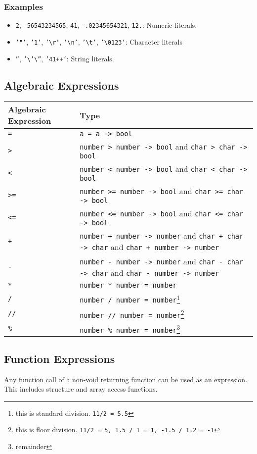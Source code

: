 \documentclass{article}
\newcommand{\code}[1]{\texttt{#1}}
\begin{document}
\subsubsection{Examples}
\begin{itemize}
\item \code{2}, \code{-56543234565}, \code{41}, \code{-.02345654321}, \code{12.}: Numeric literals.
\item \code{'"'}, \code{'1'}, \code{'\textbackslash{}r'}, \code{'\textbackslash{}n'}, \code{'\textbackslash{}t'}, \code{'\textbackslash{}0123'}: Character literals
\item \code{''}, \code{'\textbackslash'\textbackslash''}, \code{'41++'}: String literals.
\end{itemize}
\subsection{Algebraic Expressions}
\begin{tabular}{|l|p{10cm}|}
\hline
Algebraic Expression & Type\\
\hline
\code{=} & \code{a = a -> bool}\\
\hline
\code{>} & \code{number > number -> bool} and \code{char > char -> bool}\\
\hline
\code{<} & \code{number < number -> bool} and \code{char < char -> bool}\\
\hline
\code{>=}& \code{number >= number -> bool} and \code{char >= char -> bool}\\
\hline
\code{<=} & \code{number <= number -> bool} and \code{char <= char -> bool}\\
\hline
\code{+}& \code{number + number -> number} and \code{char + char -> char} and \code{char + number -> number}\\
\hline
\code{-} & \code{number - number -> number} and \code{char - char -> char} and \code{char - number -> number}\\
\hline
\code{*} & \code{number * number = number}\\
\hline
\code{/} & \code{number / number = number}\footnote{this is standard division. \code{11/2 = 5.5}}\\
\hline
\code{//} & \code{number // number = number}\footnote{this is floor division. \code{11/2 = 5, 1.5 / 1 = 1, -1.5 / 1.2 = -1}}\\
\hline
\code{\%} & \code{number \% number = number}\footnote{remainder}\\
\hline
\end{tabular}
\subsection{Function Expressions}
Any function call of a non-void returning function can be used as an expression. This includes structure and array access functions.
\end{document}
